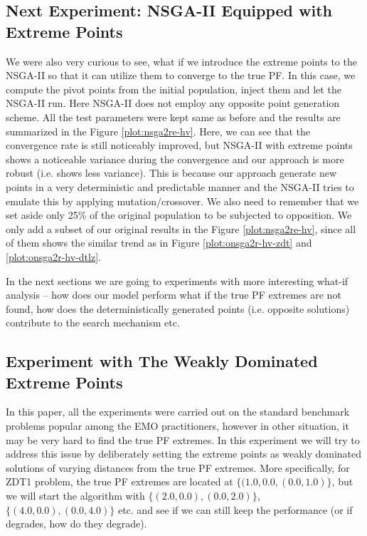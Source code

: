 \documentclass[journal]{IEEEtran}
\begin{document}
\subsection{Next Experiment: NSGA-II Equipped with Extreme Points}
\label{subsec:nsga2re}
We were also very curious to see, what if we introduce the extreme points to the NSGA-II so that it can utilize them to converge to the true PF. In this case, we compute the pivot points from the initial population, inject them and let the NSGA-II run. Here NSGA-II does not employ any opposite point generation scheme. All the test parameters were kept same as before and the results are summarized in the Figure \ref{plot:nsga2re-hv}. Here, we can see that the convergence rate is still noticeably improved, but NSGA-II with extreme points shows a noticeable variance during the convergence and our approach is more robust (i.e. shows less variance). This is because our approach generate new points in a very deterministic and predictable manner and the NSGA-II tries to emulate this by applying mutation/crossover. We also need to remember that we set aside only 25\% of the original population to be subjected to opposition. We only add a subset of our original results in the Figure \ref{plot:nsga2re-hv}, since all of them shows the similar trend as in Figure \ref{plot:onsga2r-hv-zdt} and \ref{plot:onsga2r-hv-dtlz}.

In the next sections we are going to experiments with more interesting what-if analysis -- how does our model perform what if the true PF extremes are not found, how does the deterministically generated points (i.e. opposite solutions) contribute to the search mechanism etc.

\subsection{Experiment with The Weakly Dominated Extreme Points}
\label{sec:weak-extremes}
In this paper, all the experiments were carried out on the standard benchmark problems popular among the EMO practitioners, however in other situation, it may be very hard to find the true PF extremes. In this experiment we will try to address this issue by deliberately setting the extreme points as weakly dominated solutions of varying distances from the true PF extremes. More specifically, for ZDT1 problem, the true PF extremes are located at \(\{(1.0, 0.0, (0.0, 1.0)\}\), but we will start the algorithm with \(\{(2.0, 0.0), (0.0, 2.0)\}\), \(\{(4.0, 0.0), (0.0, 4.0)\}\) etc. and see if we can still keep the performance (or if degrades, how do they degrade).
\end{document}
